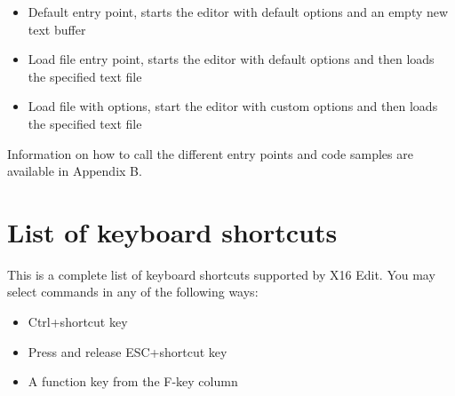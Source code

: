 \documentclass{article}
\begin{document}
        \begin{itemize}
            \item Default entry point, starts the editor with default options and an empty new text buffer
            \item Load file entry point, starts the editor with default options and then loads the specified text file
            \item Load file with options, start the editor with custom options and then loads the specified text file
        \end{itemize}

        Information on how to call the different entry points and code samples are available in Appendix B. 

\appendix
\newpage
\section{List of keyboard shortcuts}
    This is a complete list of keyboard shortcuts supported
    by X16 Edit. You may select commands in any of the following ways:

    \begin{itemize}
        \item Ctrl+shortcut key
        \item Press and release ESC+shortcut key
        \item A function key from the F-key column
    \end{itemize}
\end{document}
